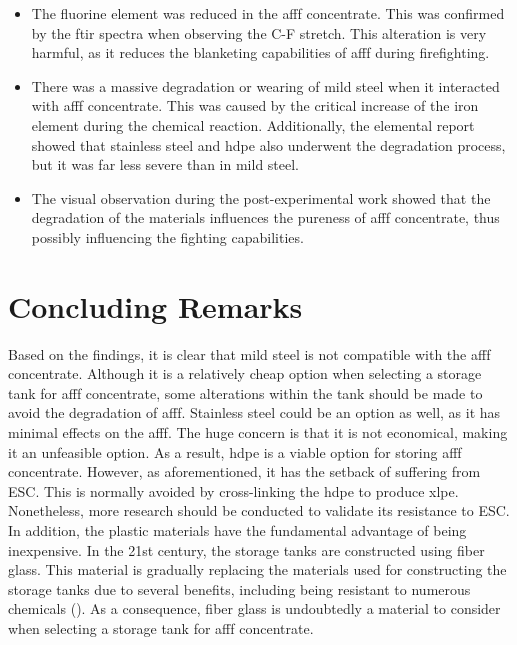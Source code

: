 \begin{itemize}
    \item The fluorine element was reduced in the \acrshort{afff} concentrate. This was confirmed by the \acrshort{ftir} spectra when observing the C-F stretch. This alteration is very harmful, as it reduces the blanketing capabilities of \acrshort{afff} during firefighting.
    \item There was a massive degradation or wearing of mild steel when it interacted with \acrshort{afff} concentrate. This was caused by the critical increase of the iron element during the chemical reaction. Additionally, the elemental report showed that stainless steel and \acrshort{hdpe} also underwent the degradation process, but it was far less severe than in mild steel.
    \item The visual observation during the post-experimental work showed that the degradation of the materials influences the pureness of \acrshort{afff} concentrate, thus possibly influencing the fighting capabilities.
\end{itemize}

\section{Concluding Remarks}
Based on the findings, it is clear that mild steel is not compatible with the \acrshort{afff} concentrate. Although it is a relatively cheap option when selecting a storage tank for \acrshort{afff} concentrate, some alterations within the tank should be made to avoid the degradation of \acrshort{afff}. Stainless steel could be an option as well, as it has minimal effects on the \acrshort{afff}. The huge concern is that it is not economical, making it an unfeasible option. As a result, \acrshort{hdpe} is a viable option for storing \acrshort{afff} concentrate. However, as aforementioned, it has the setback of suffering from ESC. This is normally avoided by cross-linking the \acrshort{hdpe} to produce \acrfull{xlpe}. Nonetheless, more research should be conducted to validate its resistance to ESC. In addition, the plastic materials have the fundamental advantage of being inexpensive.
In the 21st century, the storage tanks are constructed using fiber glass. This material is gradually replacing the materials used for constructing the storage tanks due to several benefits, including being resistant to numerous chemicals (\cite{avdeeva2016chemical}). As a consequence, fiber glass is undoubtedly a material to consider when selecting a storage tank for \acrshort{afff} concentrate.


